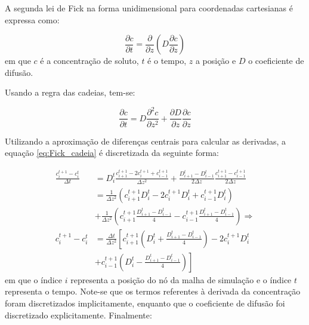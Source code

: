 
\label{ap:discretizacao_Fick}

A segunda lei de Fick na forma unidimensional para coordenadas cartesianas é expressa como:

\begin{equation}
  \frac{\partial c}{\partial t} = \frac{\partial}{\partial z} \left( D \frac{\partial c}{\partial z} \right)
\end{equation}
%
em que $c$ é a concentração de soluto, $t$ é o tempo, $z$ a posição e $D$ o coeficiente de difusão.

Usando a regra das cadeias, tem-se:

\begin{equation}
  \frac{\partial c}{\partial t} =  D \frac{\partial^2 c}{\partial z^2} + \frac{\partial D}{\partial z} \frac{\partial c}{\partial z}
  \label{eq:Fick_cadeia}
\end{equation}
 
Utilizando a aproximação de diferenças centrais para calcular as derivadas, a equação \ref{eq:Fick_cadeia} é discretizada da seguinte forma:

\begin{align}
  \frac{c^{t+1}_i - c^{t}_i}{\Delta t} &=  D_i^{t} \frac{c^{t+1}_{i+1} - 2 c^{t+1}_{i} + c^{t+1}_{i-1}}{\Delta z^2} + \frac{D^{t}_{i+1} - D^{t}_{i-1}}{2\Delta z} \frac{c^{t+1}_{i+1} - c^{t+1}_{i-1}}{2\Delta z} \nonumber \\
  &= \frac{1}{\Delta z^2} \left( c^{t+1}_{i+1} D_i^{t} - 2 c^{t+1}_{i} D_i^{t} + c^{t+1}_{i-1} D_i^{t} \right) \nonumber \\
  &+ \frac{1}{\Delta z^2} \left( c^{t+1}_{i+1} \frac{D^{t}_{i+1} - D^{t}_{i-1}}{4} - c^{t+1}_{i-1} \frac{D^{t}_{i+1} - D^{t}_{i-1}}{4} \right) \Rightarrow \nonumber \\
  c^{t+1}_i - c^t_i &= \frac{\Delta t}{\Delta z^2} \left[c^{t+1}_{i+1}\left(D^{t}_i +  \frac{D^{t}_{i+1} - D^{t}_{i-1}}{4}\right) - 2 c^{t+1}_{i} D_i^{t} \right. \nonumber \\
  &\left.+ c^{t+1}_{i-1}\left(D^{t}_i - \frac{D^{t}_{i+1} - D^{t}_{i-1}}{4}\right)\right]
\end{align}
%
em que o índice $i$ representa a posição do nó da malha de simulação e o índice $t$ representa o tempo. Note-se que os termos referentes à derivada da concentração foram discretizados implicitamente, enquanto que o coeficiente de difusão foi discretizado explicitamente. Finalmente:

